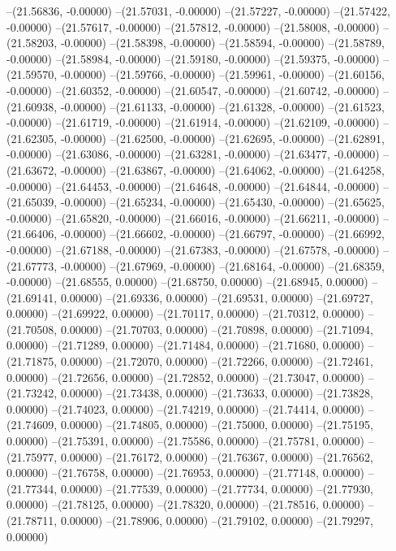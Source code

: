 --(21.56836, -0.00000)
--(21.57031, -0.00000)
--(21.57227, -0.00000)
--(21.57422, -0.00000)
--(21.57617, -0.00000)
--(21.57812, -0.00000)
--(21.58008, -0.00000)
--(21.58203, -0.00000)
--(21.58398, -0.00000)
--(21.58594, -0.00000)
--(21.58789, -0.00000)
--(21.58984, -0.00000)
--(21.59180, -0.00000)
--(21.59375, -0.00000)
--(21.59570, -0.00000)
--(21.59766, -0.00000)
--(21.59961, -0.00000)
--(21.60156, -0.00000)
--(21.60352, -0.00000)
--(21.60547, -0.00000)
--(21.60742, -0.00000)
--(21.60938, -0.00000)
--(21.61133, -0.00000)
--(21.61328, -0.00000)
--(21.61523, -0.00000)
--(21.61719, -0.00000)
--(21.61914, -0.00000)
--(21.62109, -0.00000)
--(21.62305, -0.00000)
--(21.62500, -0.00000)
--(21.62695, -0.00000)
--(21.62891, -0.00000)
--(21.63086, -0.00000)
--(21.63281, -0.00000)
--(21.63477, -0.00000)
--(21.63672, -0.00000)
--(21.63867, -0.00000)
--(21.64062, -0.00000)
--(21.64258, -0.00000)
--(21.64453, -0.00000)
--(21.64648, -0.00000)
--(21.64844, -0.00000)
--(21.65039, -0.00000)
--(21.65234, -0.00000)
--(21.65430, -0.00000)
--(21.65625, -0.00000)
--(21.65820, -0.00000)
--(21.66016, -0.00000)
--(21.66211, -0.00000)
--(21.66406, -0.00000)
--(21.66602, -0.00000)
--(21.66797, -0.00000)
--(21.66992, -0.00000)
--(21.67188, -0.00000)
--(21.67383, -0.00000)
--(21.67578, -0.00000)
--(21.67773, -0.00000)
--(21.67969, -0.00000)
--(21.68164, -0.00000)
--(21.68359, -0.00000)
--(21.68555, 0.00000)
--(21.68750, 0.00000)
--(21.68945, 0.00000)
--(21.69141, 0.00000)
--(21.69336, 0.00000)
--(21.69531, 0.00000)
--(21.69727, 0.00000)
--(21.69922, 0.00000)
--(21.70117, 0.00000)
--(21.70312, 0.00000)
--(21.70508, 0.00000)
--(21.70703, 0.00000)
--(21.70898, 0.00000)
--(21.71094, 0.00000)
--(21.71289, 0.00000)
--(21.71484, 0.00000)
--(21.71680, 0.00000)
--(21.71875, 0.00000)
--(21.72070, 0.00000)
--(21.72266, 0.00000)
--(21.72461, 0.00000)
--(21.72656, 0.00000)
--(21.72852, 0.00000)
--(21.73047, 0.00000)
--(21.73242, 0.00000)
--(21.73438, 0.00000)
--(21.73633, 0.00000)
--(21.73828, 0.00000)
--(21.74023, 0.00000)
--(21.74219, 0.00000)
--(21.74414, 0.00000)
--(21.74609, 0.00000)
--(21.74805, 0.00000)
--(21.75000, 0.00000)
--(21.75195, 0.00000)
--(21.75391, 0.00000)
--(21.75586, 0.00000)
--(21.75781, 0.00000)
--(21.75977, 0.00000)
--(21.76172, 0.00000)
--(21.76367, 0.00000)
--(21.76562, 0.00000)
--(21.76758, 0.00000)
--(21.76953, 0.00000)
--(21.77148, 0.00000)
--(21.77344, 0.00000)
--(21.77539, 0.00000)
--(21.77734, 0.00000)
--(21.77930, 0.00000)
--(21.78125, 0.00000)
--(21.78320, 0.00000)
--(21.78516, 0.00000)
--(21.78711, 0.00000)
--(21.78906, 0.00000)
--(21.79102, 0.00000)
--(21.79297, 0.00000)

